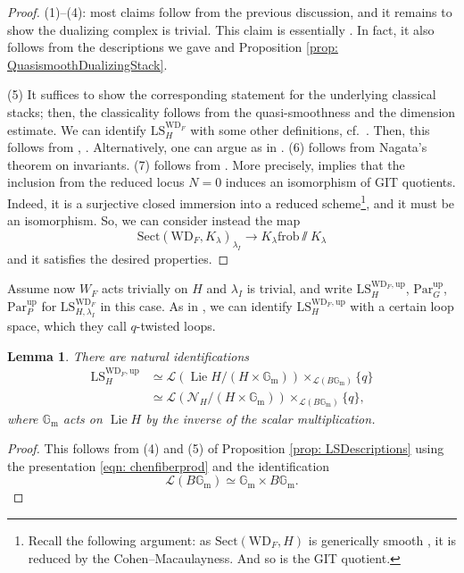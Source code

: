 \documentclass{amsart}
\newtheorem{lemma}[theorem]{Lemma}
\theoremstyle{definition}
\theoremstyle{remark}
\numberwithin{equation}{section}
\DeclareMathOperator{\Lie}{Lie}
\newcommand{\mc}{\mathcal}
\newcommand{\Gm}{{\mathbb{G}_{\mathrm{m}}}}
\newcommand{\frob}{\mathrm{frob}}
\newcommand{\Par}{\mathrm{Par}}
\newcommand{\up}{\mathrm{up}}
\newcommand{\WD}{\mathrm{WD}}
\newcommand{\LS}{\mathrm{LS}}
\newcommand{\Sect}{\mathrm{Sect}}
\begin{document}
\begin{proof}
(1)--(4): most claims follow from the previous discussion, and it remains to show the dualizing complex is trivial. This claim is essentially \cite[Propositions 2.35, 3.7]{Zhu}. In fact, it also follows from the descriptions we gave and Proposition \ref{prop: QuasismoothDualizingStack}. 

(5) It suffices to show the corresponding statement for the underlying classical stacks; then, the classicality follows from the quasi-smoothness and the dimension estimate. We can identify $\LS^{\WD_F}_H$ with some other definitions, cf.~\cite[Proposition 4.4]{ScholzeLLCmotives}. Then, this follows from \cite[Theorem 4.1]{DHKM}, \cite[Proposition 3.7]{Zhu}. Alternatively, one can argue as in \cite[Proposition 2.1]{HellmannIwahori}. (6) follows from Nagata's theorem on invariants. (7) follows from \cite{DHKM}. More precisely, \cite[Proposition 4.17]{DHKM} implies that the inclusion from the reduced locus $N=0$ induces an isomorphism of GIT quotients. Indeed, it is a surjective closed immersion into a reduced scheme\footnote{Recall the following argument: as $\Sect(\WD_F, H)$ is generically smooth \cite{BellovinGee, BooherPatrikis}, it is reduced by the Cohen--Macaulayness. And so is the GIT quotient.}, and it must be an isomorphism. So, we can consider instead the map
\[
\Sect (\WD_F, K_\lambda)_{\lambda_I} \to K_\lambda \frob \sslash K_\lambda
\]
and it satisfies the desired properties. 
\end{proof}

Assume now $W_F$ acts trivially on $H$ and $\lambda_I$ is trivial, and write $\LS_H^{\WD_F, \up}$,  $\Par_G^{\up}$, $\Par_P^{\up}$ for $\LS^{\WD_F}_{H, \lambda_I}$ in this case. As in \cite[\S 3.2]{BCHNconstructible}, we can identify $\LS_H^{\WD_F, \up}$ with a certain loop space, which they call $q$-twisted loops. 

\begin{lemma}\label{lem: loopInterpretationGlobally}
There are natural identifications
\begin{align*}
\LS^{\WD_F, \up}_{H} 
&\simeq
\mc L(\Lie H/(H\times \Gm))\times_{\mc L(B\Gm)}\{q\} \\
&\simeq
\mc L(\mc N_H/(H\times \Gm))\times_{\mc L(B\Gm)}\{q\},  
\end{align*}
where $\Gm$ acts on $\Lie H$ by the inverse of the scalar multiplication. \end{lemma}

\begin{proof}
    This follows from (4) and (5) of Proposition \ref{prop: LSDescriptions} using the presentation \eqref{eqn: chenfiberprod} and the identification
    \begin{equation*}
        \mc{L}(B\Gm) \simeq \Gm \times B\Gm.
    \end{equation*}
\end{proof}
\end{document}
